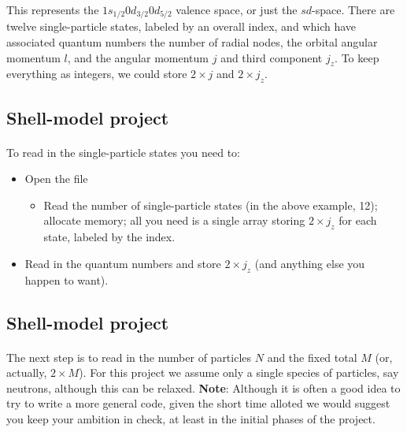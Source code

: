 \documentclass[%
oneside,                 %
final,                   %
10pt]{article}
\begin{document}
\noindent
This represents the $1s_{1/2}0d_{3/2}0d_{5/2}$ valence space, or just the $sd$-space.  There are 
twelve single-particle states, labeled by an overall index, and which have associated quantum 
numbers the number of radial nodes, the orbital angular momentum $l$, and the 
angular momentum $j$ and third component $j_z$.  To keep everything as integers, we could store $2 \times j$ and 
$2 \times j_z$.



\subsection*{Shell-model project}

\paragraph{}
To read in the single-particle states you need to:
\begin{itemize}
\item Open the file 
\begin{itemize}

 \item Read the number of single-particle states (in the above example, 12);  allocate memory; all you need is a single array storing $2\times j_z$ for each state, labeled by the index.

\end{itemize}

\noindent
\item Read in the quantum numbers and store $2 \times j_z$ (and anything else you happen to want).
\end{itemize}

\noindent



\subsection*{Shell-model project}

\paragraph{}

The next step is to read in the number of particles $N$ and the fixed total $M$ (or, actually, $2 \times M$). 
For this project we assume only a single species of particles, say neutrons, although this can be 
relaxed. \textbf{Note}: Although it is often a good idea to try to write a more general code, given the 
short time alloted we would suggest you keep your ambition in check, at least in the initial phases of the 
project.  
\end{document}
